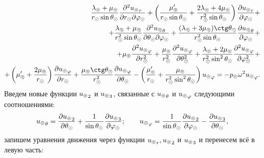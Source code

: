 \begin{equation*}
\begin{split}
\fr{\la\l+\mu\l}{r\s\sin\Q\s} \fr{\de^2{u\l}_r}{\de r\s \de \f\s} + \left(\fr{\mu\l'}{r\s\sin\Q\s} + \fr{2\la\l+4\mu\l}{r\s^2\sin\Q\s} \right)\fr{\de {u\l}_r}{\de \f\s} +\\
+ \fr{\la\l+\mu\l}{r\s^2\sin\Q\s}\fr{\de^2 {u\l}_\Q}{\de \Q\s \de \f\s} + \fr{(\la\l+3\mu\l)\ctg\Q\s}{r\s^2\sin\Q\s}\fr{\de {u\l}_\Q}{\de \f\s} +\\
+ \mu\l \fr{\de^2 {u\l}_\f}{\de r\s^2} + \fr{\mu\l}{r\s^2}\fr{\de^2 {u\l}_\f}{\de \Q\s^2} + \fr{\la\l+2\mu\l}{r\s^2\sin^2\Q\s} \fr{\de^2 {u\l}_\f}{\de \f\s^2} + \\
+ \left(\mu\l'+\fr{2\mu\l}{r\s}\right)\fr{\de {u\l}_\f}{\de r\s} + \fr{\mu\l\ctg\Q\s}{r\s^2}\fr{\de {u\l}_\f}{\de \Q\s} - \left(\fr{\mu\l'}{r\s} + \fr{\mu\l}{r\s^2\sin^2\Q\s}\right){u\l}_\f = - p\l\om^2{u\l}_\f.
\end{split}
\end{equation*}
Введем новые функции ${u_\circledcirc}_2$ и ${u_\circledcirc}_3$, связанные с ${u_\circledcirc}_\theta$ и ${u_\circledcirc}_\varphi$ следующими соотношениями:
\begin{equation}\label{eq_v2v3}
{u_\circledcirc}_\theta = \dfrac{\partial {u_\circledcirc}_2}{\partial\theta_\odot} + \frac1{\sin\theta_\odot}\frac{\partial {u_\circledcirc}_3}{\partial\varphi_\odot}; \qquad {u_\circledcirc}_\varphi = \dfrac1{\sin\theta_\odot}\dfrac{\partial {u_\circledcirc}_2}{\partial\varphi_\odot} - \dfrac{\partial {u_\circledcirc}_3}{\partial\theta_\odot},
\end{equation}
запишем уравнения движения через функции ${u_\circledcirc}_r, {u_\circledcirc}_2$ и ${u_\circledcirc}_3$ и перенесем всё в левую часть:

